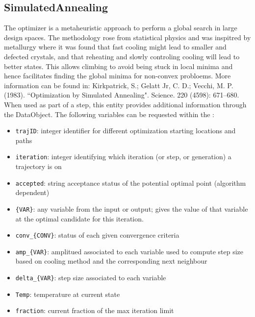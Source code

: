 \subsection{SimulatedAnnealing}
  The  optimizer is a metaheuristic approach
  to perform a global search in large design spaces. The methodology rose
  from statistical physics and was inspitred by metallurgy where                             it was
  found that fast cooling might lead to smaller and defected crystals,
  and that reheating and slowly controling cooling will lead to better states.
  This allows climbing to avoid being stuck in local minima and hence facilitates
  finding the global minima for non-convex probloems.                             More information
  can be found in: Kirkpatrick, S.; Gelatt Jr, C. D.; Vecchi, M. P. (1983).
  ``Optimization by Simulated Annealing". Science. 220 (4598): 671–680.
\vspace{7pt} \\When used as part of a  step, this entity provides
        additional information through the  DataObject. The
        following variables can be requested within the :
        \begin{itemize}
          \item \texttt{trajID}: integer identifier for different optimization starting locations and paths
             \item \texttt{iteration}: integer identifying which iteration (or step, or generation) a trajectory is on
             \item \texttt{accepted}: string acceptance status of the potential optimal point (algorithm dependent)
             \item \texttt{\{VAR\}}: any variable from the  input or output; gives the value of that variable at the optimal candidate for this iteration.
             \item \texttt{conv\_\{CONV\}}: status of each given convergence criteria
             \item \texttt{amp\_\{VAR\}}: amplitued associated to each variable used to compute step size based on cooling method and the corresponding next neighbour
             \item \texttt{delta\_\{VAR\}}: step size associated to each variable
             \item \texttt{Temp}: temperature at current state
             \item \texttt{fraction}: current fraction of the max iteration limit

         \end{itemize}

